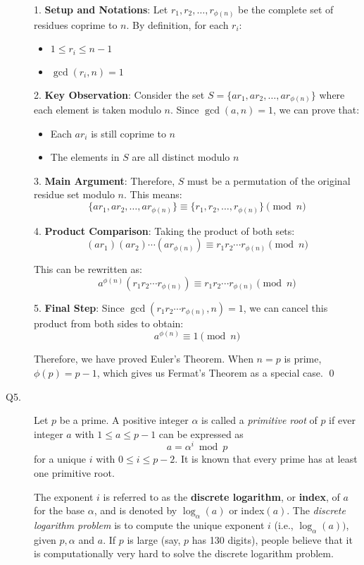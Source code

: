 \documentclass[11pt,epsfig]{article}
\begin{document}
\begin{description}
1. \textbf{Setup and Notations}:
    Let \(r_1, r_2, \dots, r_{\phi(n)}\) be the complete set of residues coprime to \(n\).
    By definition, for each \(r_i\):
    \begin{itemize}
        \item \(1 \leq r_i \leq n-1\)
        \item \(\gcd(r_i, n) = 1\)
    \end{itemize}

2. \textbf{Key Observation}:
    Consider the set \(S = \{ar_1, ar_2, \dots, ar_{\phi(n)}\}\) where each element is taken modulo \(n\).
    Since \(\gcd(a,n) = 1\), we can prove that:
    \begin{itemize}
        \item Each \(ar_i\) is still coprime to \(n\)
        \item The elements in \(S\) are all distinct modulo \(n\)
    \end{itemize}

3. \textbf{Main Argument}:
    Therefore, \(S\) must be a permutation of the original residue set modulo \(n\). This means:
    \[
    \{ar_1, ar_2, \dots, ar_{\phi(n)}\} \equiv \{r_1, r_2, \dots, r_{\phi(n)}\} \pmod{n}
    \]

4. \textbf{Product Comparison}:
    Taking the product of both sets:
    \[
    (ar_1)(ar_2)\cdots(ar_{\phi(n)}) \equiv r_1r_2\cdots r_{\phi(n)} \pmod{n}
    \]
    
    This can be rewritten as:
    \[
    a^{\phi(n)}(r_1r_2\cdots r_{\phi(n)}) \equiv r_1r_2\cdots r_{\phi(n)} \pmod{n}
    \]

5. \textbf{Final Step}:
    Since \(\gcd(r_1r_2\cdots r_{\phi(n)}, n) = 1\), we can cancel this product from both sides to obtain:
    \[
    a^{\phi(n)} \equiv 1 \pmod{n}
    \]

\noindent Therefore, we have proved Euler's Theorem. When \(n = p\) is prime, \(\phi(p) = p-1\), which gives us Fermat's Theorem as a special case. \qed



\item[Q5.] Let $p$ be a prime. A positive integer $\alpha$ is called a \emph{primitive root} of $p$ if ever integer 
$a$ with $1 \leq a \leq p-1$ can be expressed as 
$$
a = \alpha^i \bmod{p} 
$$ 
for a unique $i$ with $0 \leq i \leq p-2$. It is known that every prime has at least one primitive root.  

The exponent $i$ is referred to as the \textbf{discrete logarithm}, or \textbf{index}, of $a$ for the base $\alpha$, 
and is denoted by $\log_\alpha(a)$ or index$(a)$. The \emph{discrete logarithm problem} is to compute the unique 
exponent $i$ (i.e., $\log_\alpha(a))$, given $p, \alpha$ and $a$. If $p$ is large (say, $p$ has 130 digits), 
people believe that it is computationally very hard to solve the discrete logarithm problem. 


\end{description}
\end{document}
